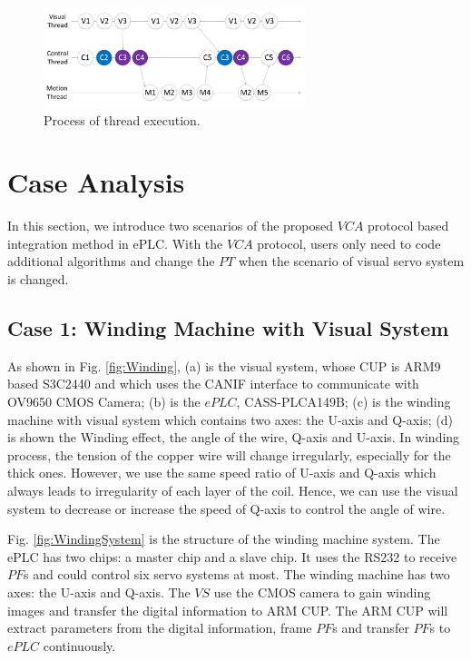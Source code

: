 \documentclass[journal,UTF8]{IEEEtran}
\begin{document}
\begin{figure}
	\centering
	\includegraphics[width=3in]{fig/ThreadExecution.pdf}
	\caption{ Process of thread execution.}
	\label{fig:threadExecution}
\end{figure}

\section{Case Analysis}
\label{Case}
In this section, we introduce two scenarios of the proposed $VCA$ protocol based integration method in ePLC. With the $VCA$ protocol, users only need to code additional algorithms and change the $PT$ when the scenario of visual servo system is changed. 

\subsection{Case 1: Winding Machine with Visual System}
  
As shown in Fig. \ref{fig:Winding}, (a) is the visual system, whose CUP is ARM9 based S3C2440 and which uses the CANIF interface to communicate with OV9650 CMOS Camera; (b) is the $ePLC$, CASS-PLCA149B; (c) is the winding machine with visual system which contains two axes: the U-axis and Q-axis; (d) is shown the Winding effect, the angle of the wire, Q-axis and U-axis. In winding process, the tension of the copper wire will change irregularly, especially for the thick ones. However, we use the same speed ratio of U-axis and Q-axis which always leads to irregularity of each layer of the coil. Hence, we can use the visual system to decrease or increase the speed of Q-axis to control the angle of wire. 

Fig. \ref{fig:WindingSystem} is the structure of the winding machine system. The ePLC has two chips: a master chip and a slave chip. It uses the RS232 to receive $PF$s and could control six servo systems at most. The winding machine has two axes: the U-axis and Q-axis. The $VS$ use the CMOS camera to gain winding images and transfer the digital information to ARM CUP. The ARM CUP will extract parameters from the digital information, frame $PF$s and transfer $PF$s to $ePLC$ continuously. 
\end{document}

